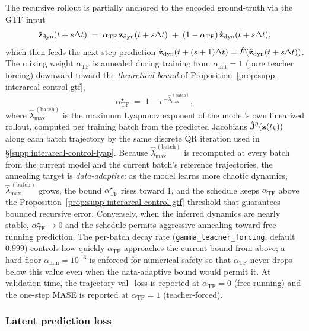 The recursive rollout is partially anchored to the encoded ground-truth via the GTF input
\begin{equation}
\tilde{\vb{z}}_{\mathrm{dyn}}(t+s\Delta t) \;=\; \alpha_{\mathrm{TF}}\,\vb{z}_{\mathrm{dyn}}(t+s\Delta t)\;+\;(1-\alpha_{\mathrm{TF}})\,\hat{\vb{z}}_{\mathrm{dyn}}(t+s\Delta t),
\end{equation}
which then feeds the next-step prediction $\hat{\vb{z}}_{\mathrm{dyn}}(t+(s+1)\Delta t)=\hat{F}(\tilde{\vb{z}}_{\mathrm{dyn}}(t+s\Delta t))$. The mixing weight $\alpha_{\mathrm{TF}}$ is annealed during training from $\alpha_{\mathrm{init}}=1$ (pure teacher forcing) downward toward the \emph{theoretical bound} of Proposition~\ref{prop:supp-interareal-control-gtf},
\begin{equation}
\alpha_{\mathrm{TF}}^{\star} \;=\; 1 - e^{-\hat{\lambda}_{\max}^{\,(\mathrm{batch})}},
\label{eq:supp-interareal-control-gtf-target}
\end{equation}
where $\hat{\lambda}_{\max}^{\,(\mathrm{batch})}$ is the maximum Lyapunov exponent of the model's own linearized rollout, computed per training batch from the predicted Jacobians $\hat{\mathbf{J}}^{\theta}(\vb{z}(t_{k}))$ along each batch trajectory by the same discrete QR iteration used in \S\ref{supp:interareal-control-lyap}. Because $\hat{\lambda}_{\max}^{\,(\mathrm{batch})}$ is recomputed at every batch from the current model and the current batch's reference trajectories, the annealing target is \emph{data-adaptive}: as the model learns more chaotic dynamics, $\hat{\lambda}_{\max}^{\,(\mathrm{batch})}$ grows, the bound $\alpha_{\mathrm{TF}}^{\star}$ rises toward 1, and the schedule keeps $\alpha_{\mathrm{TF}}$ above the Proposition~\ref{prop:supp-interareal-control-gtf} threshold that guarantees bounded recursive error. Conversely, when the inferred dynamics are nearly stable, $\alpha_{\mathrm{TF}}^{\star}\!\to\!0$ and the schedule permits aggressive annealing toward free-running prediction. The per-batch decay rate (\texttt{gamma\_teacher\_forcing}, default $0.999$) controls how quickly $\alpha_{\mathrm{TF}}$ approaches the current bound from above; a hard floor $\alpha_{\min}=10^{-3}$ is enforced for numerical safety so that $\alpha_{\mathrm{TF}}$ never drops below this value even when the data-adaptive bound would permit it. At validation time, the trajectory val\_loss is reported at $\alpha_{\mathrm{TF}}=0$ (free-running) and the one-step MASE is reported at $\alpha_{\mathrm{TF}}=1$ (teacher-forced).

\subsubsection{Latent prediction loss}\label{supp:interareal-control-latent-pred}

